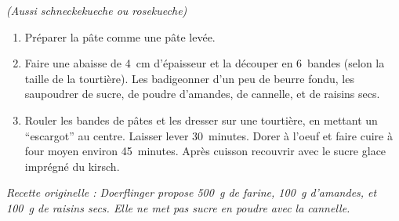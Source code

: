 \prep{}

\textit{(Aussi schneckekueche ou rosekueche)}

\begin{ingredients}



\end{ingredients}


\begin{recipe}
  \begin{enumerate}

  \item Préparer la pâte comme une pâte levée.

  \item Faire une abaisse de 4~cm d'épaisseur et la découper en
    6~bandes (selon la taille de la tourtière).  Les badigeonner d'un
    peu de beurre fondu, les saupoudrer de sucre, de poudre d'amandes,
    de cannelle, et de raisins secs.

  \item Rouler les bandes de pâtes et les dresser sur une tourtière,
    en mettant un ``escargot'' au centre.  Laisser lever 30~minutes.
    Dorer à l'oeuf et faire cuire à four moyen environ 45~minutes.
    Après cuisson recouvrir avec le sucre glace imprégné du kirsch.

  \end{enumerate}
\end{recipe}


{\it Recette originelle : Doerflinger propose 500~g de farine, 100~g
  d'amandes, et 100~g de raisins secs.  Elle ne met pas sucre en
  poudre avec la cannelle.  }
